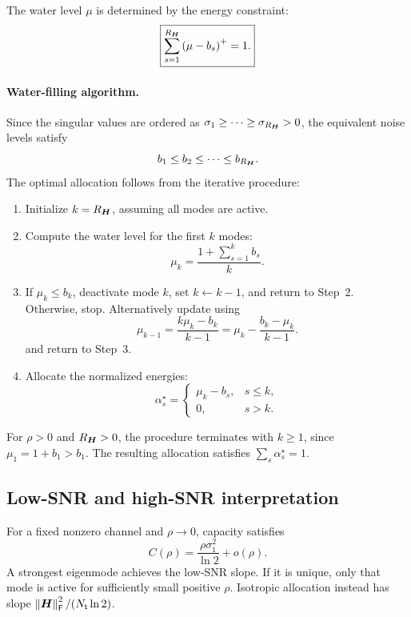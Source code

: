 The water level $\mu$ is determined by the energy constraint:
\begin{equation}\label{eq:water-level}
	\boxed{
		\sum_{s=1}^{R_{\bm{H}}}
		\left(\mu-b_s\right)^+=1.
	}
\end{equation}


\paragraph{Water-filling algorithm.}
Since the singular values are ordered as
$\sigma_1\geq\cdots\geq\sigma_{R_{\bm{H}}}>0$,
the equivalent noise levels satisfy
\begin{equation*}
	b_1\leq b_2\leq\cdots\leq b_{R_{\bm{H}}}.
\end{equation*}
The optimal allocation follows from the iterative procedure:

\begin{enumerate}
	\item Initialize $k=R_{\bm{H}}$, assuming all modes are active.
	
	\item Compute the water level for the first $k$ modes:
	\begin{equation}\label{eq:level}
		\boxed{
			\mu_k=\frac{1+\sum_{s=1}^{k}b_s}{k}.
		}
	\end{equation}
	\item If $\mu_k\leq b_k$, deactivate mode $k$,
	set $k\leftarrow k-1$, and return to Step~2.
	Otherwise, stop.
		Alternatively update using 
	\[
	{
		\mu_{k-1}
		=\frac{k\mu_k-b_k}{k-1}
		=\mu_k-\frac{b_k-\mu_k}{k-1}.
	}
	\]
	and return to Step~3. 
	\item Allocate the normalized energies:
	\begin{equation*}
		\boxed{
			\alpha_s^\star=
			\begin{cases}
				\mu_k-b_s, & s\leq k,\\
				0, & s>k.
		\end{cases}}
	\end{equation*}
\end{enumerate}

For $\rho>0$ and $R_{\bm{H}}>0$, the procedure terminates
with $k\geq1$, since $\mu_1=1+b_1>b_1$.
The resulting allocation satisfies
$\sum_s\alpha_s^\star=1$.

\subsection{Low-SNR and high-SNR interpretation}

For a fixed nonzero channel and $\rho\to0$, capacity satisfies
\begin{equation*}
	C(\rho)=\frac{\rho\sigma_1^2}{\ln2}+o(\rho).
\end{equation*}
A strongest eigenmode achieves the low-SNR slope. If it is unique, only that mode is active for sufficiently small positive $\rho$. Isotropic allocation instead has slope $\left\|\bm{H}\right\|_{\mathsf{F}}^2/(N_{\mathsf{t}}\ln2)$.

